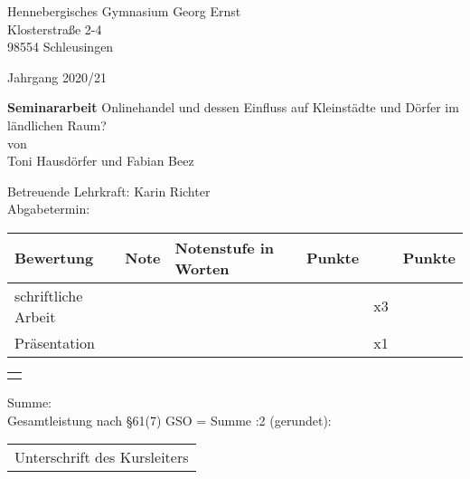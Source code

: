 \begin{titlepage}
    
    \raggedright
        Hennebergisches Gymnasium Georg Ernst\\
        Klosterstraße 2-4\\
        98554 Schleusingen
        
    \raggedleft\vspace*{-1.9cm}
        Jahrgang 2020/21
            \vfill\vfill\vfill\vfill\vfill\vfill

    \centering
        \LARGE\textbf{Seminararbeit} %
            \vfill
        \large Onlinehandel und dessen Einfluss auf Kleinstädte und Dörfer im ländlichen Raum?\\[\baselineskip]
        von\\
        Toni Hausdörfer und Fabian Beez
            \vfill\vfill\vfill\vfill

    \raggedright
        Betreuende Lehrkraft: \hfill Karin Richter\\
        Abgabetermin:\\[\baselineskip]
        \begin{tabular}[h]{|l|l|l|l|l|l|}
            \hline
            Bewertung & Note & Notenstufe in Worten & Punkte &  & Punkte \\
            \hline
            schriftliche Arbeit & & & & x3 & \\
            \hline
            Präsentation & & & & x1 & \\
            \hline
        \end{tabular}

    \raggedleft\vspace*{-0.05cm}
        \begin{tabular}[h]{|p{1.56cm}|}
            \hline
            \\
            \hline
            \\
            \hline
        \end{tabular}

    \raggedright\vspace*{-1.4cm}
        \hspace*{0.2cm}Summe: \hfill\\
        \hspace*{0.2cm}Gesamtleistung nach §61(7) GSO = Summe :2 (gerundet): \hfill\\[\baselineskip]
            \vfill\vfill\vfill
        
    \raggedleft
        \begin{tabular}{@{}l@{}}\hline
            Unterschrift des Kursleiters
        \end{tabular}
            \vfill\vfill
\end{titlepage}

\newpage
